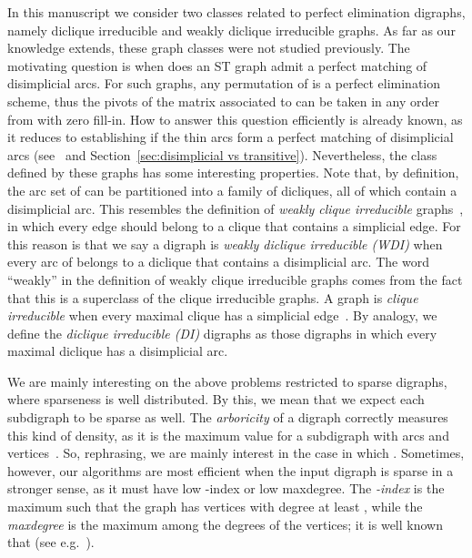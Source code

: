 \documentclass[a4paper,11pt]{article}
\begin{document}
In this manuscript we consider two classes related to perfect elimination digraphs, namely diclique irreducible and weakly diclique irreducible graphs.  As far as our knowledge extends, these graph classes were not studied previously.  The motivating question is when does an ST graph  admit a perfect matching  of disimplicial arcs.  For such graphs, any permutation of  is a perfect elimination scheme, thus the pivots of the matrix associated to  can be taken in any order from  with zero fill-in.  How to answer this question efficiently is already known, as it reduces to establishing if the thin arcs form a perfect matching of disimplicial arcs (see~\cite{BomhoffMantheyDAM2013} and Section~\ref{sec:disimplicial vs transitive}).  Nevertheless, the class defined by these graphs has some interesting properties.  Note that, by definition, the arc set of  can be partitioned into a family of dicliques, all of which contain a disimplicial arc.  This resembles the definition of \emph{weakly clique irreducible} graphs~\cite{WangCN2003}, in which every edge should belong to a clique that contains a simplicial edge.  For this reason is that we say a digraph  is \emph{weakly diclique irreducible (WDI)} when every arc of  belongs to a diclique that contains a disimplicial arc.  The word ``weakly'' in the definition of weakly clique irreducible graphs comes from the fact that this is a superclass of the clique irreducible graphs.  A graph is \emph{clique irreducible} when every maximal clique has a simplicial edge~\cite{WallisZhangJCMCC1990}.  By analogy, we define the \emph{diclique irreducible (DI)} digraphs as those digraphs in which every maximal diclique has a disimplicial arc.  

We are mainly interesting on the above problems restricted to sparse digraphs, where sparseness is well distributed.  By this, we mean that we expect each subdigraph to be sparse as well.  The \emph{arboricity}  of a digraph correctly measures this kind of density, as it is the maximum value  for a subdigraph with  arcs and  vertices~\cite{Nash-WilliamsJLMS1964}.  So, rephrasing, we are mainly interest in the case in which .  Sometimes, however, our algorithms are most efficient when the input digraph is sparse in a stronger sense, as it must have low -index or low maxdegree.  The \emph{-index} is the maximum  such that the graph has  vertices with degree at least , while the \emph{maxdegree}  is the maximum among the degrees of the vertices; it is well known that  (see e.g.~\cite{LinSoulignacSzwarcfiterTCS2012}).
\end{document}
